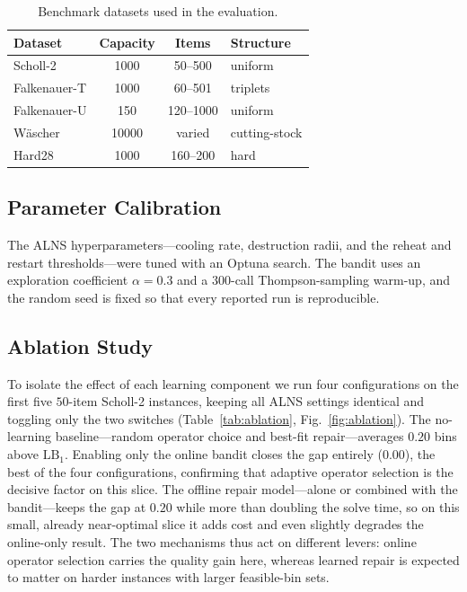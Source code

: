 \documentclass[conference]{IEEEtran}
\begin{document}
\begin{table}[htbp]
	\caption{Benchmark datasets used in the evaluation.}
	\label{tab:datasets}
	\centering
	\begin{tabular}{l c c l}
		\hline
		\textbf{Dataset} & \textbf{Capacity} & \textbf{Items} & \textbf{Structure} \\
		\hline
		Scholl-2         & 1000              & 50--500        & uniform            \\
		Falkenauer-T     & 1000              & 60--501        & triplets           \\
		Falkenauer-U     & 150               & 120--1000      & uniform            \\
		W\"ascher        & 10000             & varied         & cutting-stock      \\
		Hard28           & 1000              & 160--200       & hard               \\
		\hline
	\end{tabular}
\end{table}

\subsection{Parameter Calibration}
The ALNS hyperparameters---cooling rate, destruction radii, and the reheat and
restart thresholds---were tuned with an Optuna search. The bandit uses an
exploration coefficient $\alpha=0.3$ and a $300$-call Thompson-sampling warm-up,
and the random seed is fixed so that every reported run is reproducible.

\subsection{Ablation Study}
To isolate the effect of each learning component we run four configurations on the
first five $50$-item Scholl-2 instances, keeping all ALNS settings identical and
toggling only the two switches (Table~\ref{tab:ablation},
Fig.~\ref{fig:ablation}). The no-learning
baseline---random operator choice and best-fit repair---averages $0.20$ bins above
$\mathrm{LB}_1$. Enabling only the online bandit closes the gap entirely ($0.00$),
the best of the four configurations, confirming that adaptive operator selection is
the decisive factor on this slice. The offline repair model---alone or combined
with the bandit---keeps the gap at $0.20$ while more than doubling the solve time,
so on this small, already near-optimal slice it adds cost and even slightly
degrades the online-only result. The two mechanisms thus act on different levers:
online operator selection carries the quality gain here, whereas learned repair is
expected to matter on harder instances with larger feasible-bin sets.
\end{document}

